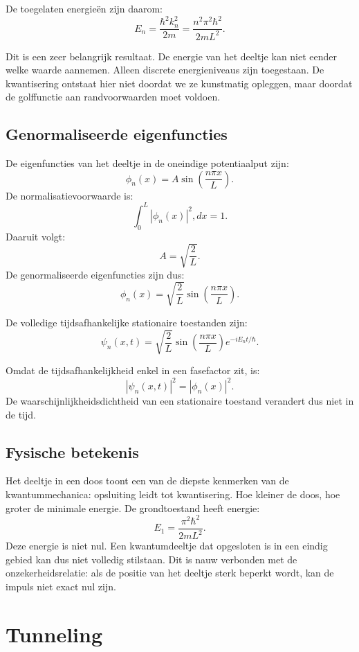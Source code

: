 \documentclass{report} %
\begin{document}
    De toegelaten energieën zijn daarom:
    \[
        E_n
        =
        \frac{\hbar^2 k_n^2}{2m}
        =
        \frac{n^2\pi^2\hbar^2}{2mL^2}.
    \]

    Dit is een zeer belangrijk resultaat. De energie van het deeltje kan niet eender welke waarde aannemen. Alleen discrete energieniveaus zijn toegestaan. De kwantisering ontstaat hier niet doordat we ze kunstmatig opleggen, maar doordat de golffunctie aan randvoorwaarden moet voldoen.

    \subsection{Genormaliseerde eigenfuncties}

    De eigenfuncties van het deeltje in de oneindige potentiaalput zijn:
    \[
        \phi_n(x)=A\sin\left(\frac{n\pi x}{L}\right).
    \]
    De normalisatievoorwaarde is:
    \[
        \int_0^L |\phi_n(x)|^2,dx=1.
    \]
    Daaruit volgt:
    \[
        A=\sqrt{\frac{2}{L}}.
    \]
    De genormaliseerde eigenfuncties zijn dus:
    \[
        \phi_n(x)
        =
        \sqrt{\frac{2}{L}}
        \sin\left(\frac{n\pi x}{L}\right).
    \]

    De volledige tijdsafhankelijke stationaire toestanden zijn:
    \[
        \psi_n(x,t)
        =
        \sqrt{\frac{2}{L}}
        \sin\left(\frac{n\pi x}{L}\right)
        e^{-iE_nt/\hbar}.
    \]

    Omdat de tijdsafhankelijkheid enkel in een fasefactor zit, is:
    \[
        |\psi_n(x,t)|^2
        =
        |\phi_n(x)|^2.
    \]
    De waarschijnlijkheidsdichtheid van een stationaire toestand verandert dus niet in de tijd.

    \subsection{Fysische betekenis}

    Het deeltje in een doos toont een van de diepste kenmerken van de kwantummechanica: opsluiting leidt tot kwantisering. Hoe kleiner de doos, hoe groter de minimale energie. De grondtoestand heeft energie:
    \[
        E_1=\frac{\pi^2\hbar^2}{2mL^2}.
    \]
    Deze energie is niet nul. Een kwantumdeeltje dat opgesloten is in een eindig gebied kan dus niet volledig stilstaan. Dit is nauw verbonden met de onzekerheidsrelatie: als de positie van het deeltje sterk beperkt wordt, kan de impuls niet exact nul zijn.


    \section{Tunneling}
\end{document}
